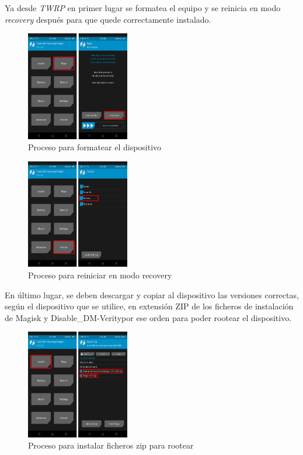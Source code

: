 \documentclass[12pt,a4paper,onecolumn,oneside]{report}
\begin{document}
Ya desde \textit{TWRP} en primer lugar se formatea el equipo y se reinicia en modo \textit{recovery} después para que quede correctamente instalado.

\begin{figure}[H] 
\centering
  \includegraphics[width=0.4\textwidth]{figuras/root52.png}
  \caption[Proceso para formatear el dispositivo]{Proceso para formatear el dispositivo\\
  }
  \label{fig:root52}
\end{figure}

\begin{figure}[!h] 
\centering
  \includegraphics[width=0.4\textwidth]{figuras/root53.png}
  \caption[Proceso para reiniciar en modo recovery]{Proceso para reiniciar en modo recovery\\
  }
  \label{fig:root53}
\end{figure}


En último lugar, se deben descargar y copiar al dispositivo las versiones correctas, según el dispositivo que se utilice, en extensión ZIP de los ficheros de instalación de Magisk y Disable\_DM-Veritypor ese orden  para poder rootear el dispositivo.

\begin{figure}[H] 
\centering
  \includegraphics[width=0.4\textwidth]{figuras/root54.png}
  \caption[Proceso para instalar ficheros zip para rootear]{Proceso para instalar ficheros zip para rootear\\
  }
  \label{fig:root54}
\end{figure}
\end{document}
